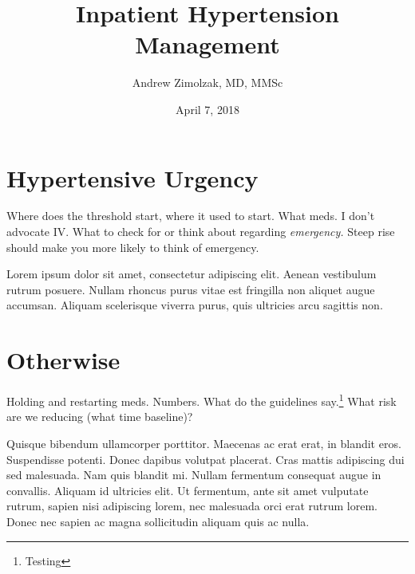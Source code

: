 \documentclass{tufte-handout}
\title{Inpatient Hypertension Management}
\author{Andrew Zimolzak, MD, MMSc}
\date{April 7, 2018}
\begin{document}
\maketitle

\section{Hypertensive Urgency}

Where does the threshold start, where it used to start. What meds. I
don't advocate IV. What to check for or think about regarding
\emph{emergency.} Steep rise should make you more likely to think of
emergency.

Lorem ipsum dolor sit amet, consectetur adipiscing elit. Aenean
vestibulum rutrum posuere. Nullam rhoncus purus vitae est fringilla
non aliquet augue accumsan. Aliquam scelerisque viverra purus, quis
ultricies arcu sagittis non.

\section{Otherwise}

Holding and restarting meds. Numbers. What do the guidelines
say.\footnote{Testing} What risk are we reducing (what time baseline)?

Quisque bibendum ullamcorper porttitor. Maecenas ac erat erat, in
blandit eros. Suspendisse potenti. Donec dapibus volutpat placerat.
Cras mattis adipiscing dui sed malesuada. Nam quis blandit mi. Nullam
fermentum consequat augue in convallis. Aliquam id ultricies elit. Ut
fermentum, ante sit amet vulputate rutrum, sapien nisi adipiscing
lorem, nec malesuada orci erat rutrum lorem. Donec nec sapien ac magna
sollicitudin aliquam quis ac nulla.
\end{document}
